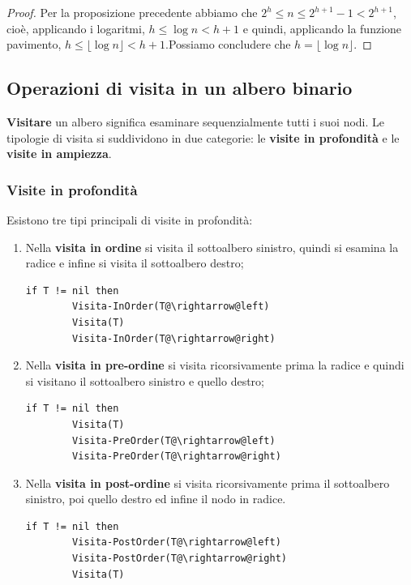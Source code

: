 \begin{proof}
Per la proposizione precedente abbiamo che $2^{h}\leq n \leq 2^{h+1}-1 < 2^{h+1}$, cioè, applicando i logaritmi, $h \leq \log n < h+1$ e quindi, applicando la funzione pavimento, $h \leq \lfloor \log n \rfloor<h+1$.Possiamo concludere che $h=\lfloor \log n \rfloor$.
\end{proof}

\subsection{Operazioni di visita in un albero binario}

\textbf{Visitare} un albero significa esaminare sequenzialmente tutti i suoi nodi. Le tipologie di visita si suddividono in due categorie: le \textbf{visite in profondità} e le \textbf{visite in ampiezza}.

\subsubsection{Visite in profondità}
Esistono tre tipi principali di visite in profondità:
\begin{enumerate}
	\item Nella \textbf{visita in ordine} si visita il sottoalbero sinistro, quindi si esamina la radice e infine si visita il sottoalbero destro;
	\begin{lstlisting}[language=asd,caption={Visita-InOrder(T)}]
	if T != nil then
		Visita-InOrder(T@\rightarrow@left)
		Visita(T)
		Visita-InOrder(T@\rightarrow@right)
	\end{lstlisting}
	\item Nella \textbf{visita in pre-ordine} si visita ricorsivamente prima la radice e quindi si visitano il sottoalbero sinistro e quello destro;
	\begin{lstlisting}[language=asd,caption={Visita-PreOrder(T)}]
	if T != nil then
		Visita(T)
		Visita-PreOrder(T@\rightarrow@left)
		Visita-PreOrder(T@\rightarrow@right)
	\end{lstlisting}

	\item Nella \textbf{visita in post-ordine} si visita ricorsivamente prima il sottoalbero sinistro, poi quello destro ed infine il nodo in radice.
	\begin{lstlisting}[language=asd,caption={Visita-PostOrder(T)}]
	if T != nil then
		Visita-PostOrder(T@\rightarrow@left)
		Visita-PostOrder(T@\rightarrow@right)
		Visita(T)
	\end{lstlisting}
\end{enumerate}

